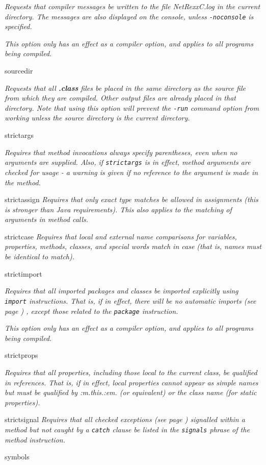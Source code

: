 \begin{description}
\emph{Requests that compiler messages be written to the file NetRexxC.log in
the current directory.
The messages are also displayed on the console, unless
\texttt{-noconsole} is specified.}
 
\emph{This option only has an effect as a compiler option, and applies to all
programs being compiled.}
\item{sourcedir}

\emph{Requests that all \textbf{.class} files be placed in the same
directory as the source file from which they are compiled.  Other output
files are already placed in that directory.
Note that using this option will prevent the \texttt{-run} command
option from working unless the source directory is the current
directory.}
\item{strictargs}

\emph{Requires that method invocations always specify parentheses, even
when no arguments are supplied.  Also, if \texttt{strictargs} is in
effect, method arguments are checked for usage - a warning is given
if no reference to the argument is made in the method.}
\item{strictassign}
\emph{Requires that only exact type matches be allowed in assignments
(this is stronger than Java requirements).
This also applies to the matching of arguments in method calls.}
\item{strictcase}
\emph{Requires that local and external name comparisons for variables,
properties, methods, classes, and special words match in case (that is,
names must be identical to match).}
\item{strictimport}

\emph{Requires that all imported packages and classes be imported
explicitly using \texttt{import} instructions.  That is, if in effect,
there will be no  automatic imports (see page \pageref{refimport}) , except those
related to the \texttt{package} instruction.}
 
\emph{This option only has an effect as a compiler option, and applies to all
programs being compiled.}
\item{strictprops}

\emph{Requires that all properties, including those local to the
current class, be qualified in references.
That is, if in effect, local properties cannot appear as simple names
but must be qualified by :m.this.:em. (or equivalent) or the class name
(for static properties).}
\item{strictsignal}
\emph{Requires that all  checked exceptions (see page \pageref{refchecked}) 
signalled within a method but not caught by a \texttt{catch} clause be
listed in the \texttt{signals} phrase of the method instruction.}
\item{symbols}


\end{description}
